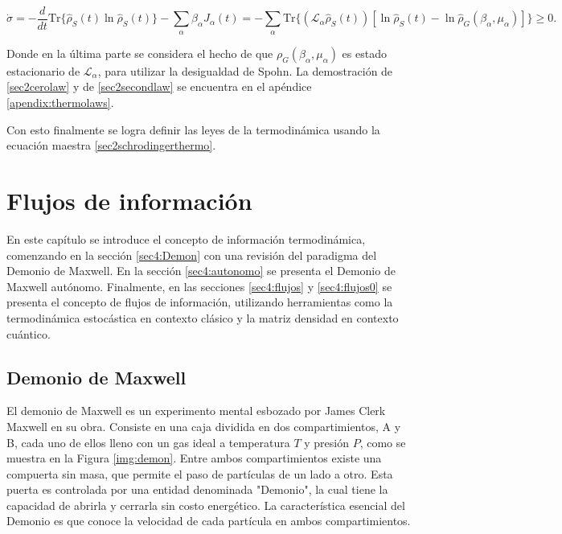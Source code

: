 \begin{equation}
    \dot{\sigma} = - \frac{d}{dt}\text{Tr}\{\hat{\rho}_{S}(t) \ln \hat{\rho}_{S}(t) \} - \sum_{\alpha} \beta_{\alpha} J_{\alpha}(t) = -\sum_{\alpha} \text{Tr}\{(\mathcal{L}_{\alpha}\hat{\rho}_{S}(t))[\ln \hat{\rho}_{S}(t) - \ln \hat{\rho}_{G}(\beta_{\alpha},\mu_{\alpha})] \} \geq 0.
\label{sec2secondlaw}
\end{equation}

Donde en la última parte se considera el hecho de que $\rho_{G}(\beta_{\alpha},\mu_{\alpha})$ es estado estacionario de $\mathcal{L}_{\alpha}$, para utilizar la desigualdad de Spohn\cite{spohn2007irreversible}. La demostración de \ref{sec2cerolaw} y de \ref{sec2secondlaw} se encuentra en el apéndice \ref{apendix:thermolaws}. 

Con esto finalmente se logra definir las leyes de la termodinámica usando la ecuación maestra \ref{sec2schrodingerthermo}.


\chapter{Flujos de información}
En este capítulo se introduce el concepto de información termodinámica, comenzando en la sección \ref{sec4:Demon} con una revisión del paradigma del Demonio de Maxwell. En la sección \ref{sec4:autonomo} se presenta el Demonio de Maxwell autónomo. Finalmente, en las secciones \ref{sec4:flujos} y \ref{sec4:flujos0} se presenta el concepto de flujos de información, utilizando herramientas como la termodinámica estocástica en contexto clásico y la matriz densidad en contexto cuántico\cite{horowitz2014thermodynamics,ptaszynski2019thermodynamics}.


\section{Demonio de Maxwell}
El demonio de Maxwell es un experimento mental esbozado por James Clerk Maxwell en su obra\cite{Maxwell_1871}. Consiste en una caja dividida en dos compartimientos, A y B, cada uno de ellos lleno con un gas ideal a temperatura $T$ y presión $P$, como se muestra en la Figura \ref{img:demon}. Entre ambos compartimientos existe una compuerta sin masa, que permite el paso de partículas de un lado a otro. Esta puerta es controlada por una entidad denominada "Demonio", la cual tiene la capacidad de abrirla y cerrarla sin costo energético. La característica esencial del Demonio es que conoce la velocidad de cada partícula en ambos compartimientos. 

